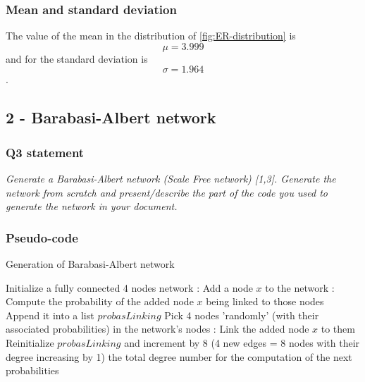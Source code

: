 \documentclass{article}
\begin{document}
\subsubsection*{Mean and standard deviation}
The value of the mean in the distribution of \autoref{fig:ER-distribution} is 
$$ \mu = 3.999 $$ and for the standard deviation is $$ \sigma = 1.964 $$. 

\subsection{2 - Barabasi-Albert network}

\subsubsection{Q3 statement}
\textit{Generate a Barabasi-Albert network (Scale Free network) [1,3]. Generate the network from scratch and present/describe the part of the code you used to generate the network in your document.}

\subsubsection*{Pseudo-code} 

\begin{algorithm}
  \caption{Generation of Barabasi-Albert network}\label{euclid}
  \begin{algorithmic}[1]
  \State Initialize a fully connected 4 nodes network
  :
  \State Add a node $x$ to the network 
  :
  \State Compute the probability of the added node $x$ being linked to those nodes
  \State Append it into a list $probasLinking$  
  \EndFor
  \State Pick 4 nodes 'randomly' (with their associated probabilities) in the network's nodes
  :
  \State Link the added node $x$ to them
  \EndFor
  \EndFor
  \State Reinitialize $probasLinking$ and increment by 8 (4 new edges = 8 nodes with their degree increasing by 1) the total degree number for the computation of the next probabilities 
  \EndProcedure
  \end{algorithmic}
\end{algorithm}

\newpage
\end{document}
